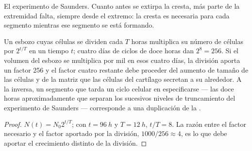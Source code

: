 \begin{omfigure}

{\small El experimento de Saunders. Cuanto antes se extirpa la cresta,
más parte de la extremidad falta, siempre desde el extremo: la cresta es
necesaria para cada segmento mientras ese segmento se está formando.}
\end{omfigure}

\begin{theorem}\label{thm:b2:limb-organogenesis:growth}
Un esbozo cuyas células se dividen cada $T$ horas multiplica su número de
células por $2^{t/T}$ en un tiempo $t$; cuatro días de ciclos de doce
horas dan
$2^{8} = 256$. Si el volumen del esbozo se multiplica por mil en esos
cuatro días, la división aporta un factor 256 y el factor cuatro restante
debe proceder del aumento de tamaño de las células y de la matriz que las
células del cartílago secretan a su alrededor. A la inversa, un segmento
que tarda un ciclo celular en especificarse --- las doce horas
aproximadamente que separan los sucesivos niveles de truncamiento del
experimento de Saunders --- corresponde a una duplicación de la .
\end{theorem}
\begin{proof}
$N(t) = N_0 2^{t/T}$; con $t = \qty{96}{h}$ y $T = \qty{12}{h}$,
$t/T = 8$. La razón entre el factor necesario y el factor aportado por la
división, $1000/256 \approx 4$, es lo que debe aportar el crecimiento
distinto de la división.
\end{proof}

